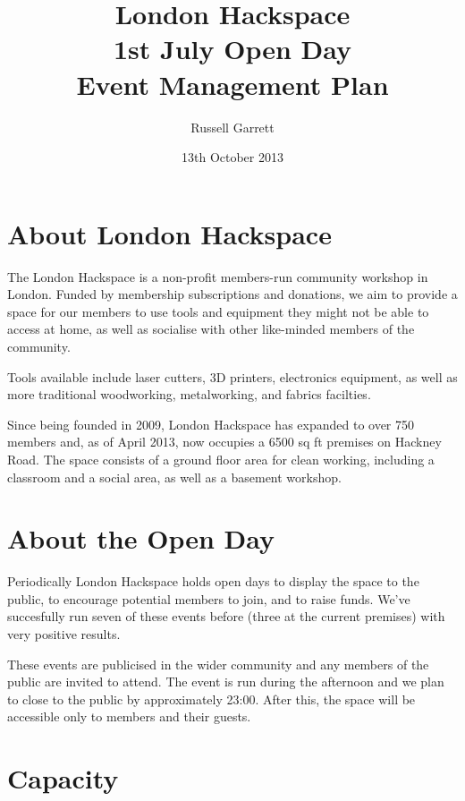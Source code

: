\title{London Hackspace\\
    1st July Open Day\\
    Event Management Plan
}


\date{13th October 2013}

\author{Russell Garrett}

\maketitle

\section{About London Hackspace}

The London Hackspace is a non-profit members-run community workshop in London.
Funded by membership subscriptions and donations, we aim to provide a space for
our members to use tools and equipment they might not be able to access at
home, as well as socialise with other like-minded members of the community.

Tools available include laser cutters, 3D printers, electronics equipment,
as well as more traditional woodworking, metalworking, and fabrics facilties.

Since being founded in 2009, London Hackspace has expanded to over 750 members
and, as of April 2013, now occupies a 6500 sq ft premises on Hackney Road.
The space consists of a ground floor area for clean working, including a
classroom and a social area, as well as a basement workshop.

\section{About the Open Day}

Periodically London Hackspace holds open days to display the space to the public,
to encourage potential members to join, and to raise funds. We've succesfully
run seven of these events before (three at the current premises) with very positive
results.

These events are publicised in the wider community and any members of the public are
invited to attend. The event is run during the afternoon and we plan to close to
the public by approximately 23:00. After this, the space will be accessible only
to members and their guests.

\section{Capacity}

